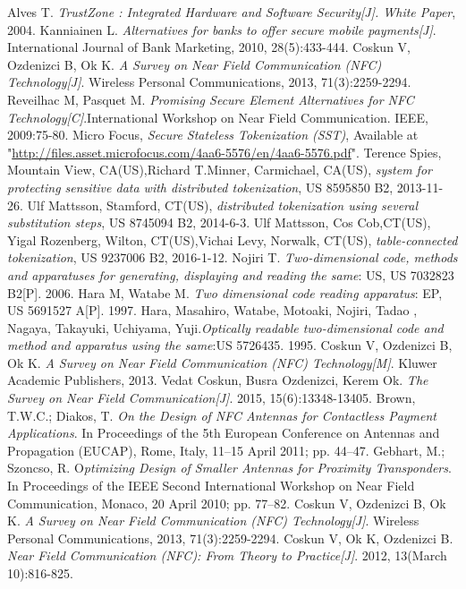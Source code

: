 \documentclass[journal]{IEEEtran}
\begin{document}
\begin{thebibliography}{1}
Alves T. \emph{TrustZone : Integrated Hardware and Software Security[J]. White Paper}, 2004.
Kanniainen L. \emph{Alternatives for banks to offer secure mobile payments[J]}. International Journal of Bank Marketing, 2010, 28(5):433-444.
Coskun V, Ozdenizci B, Ok K. \emph{A Survey on Near Field Communication (NFC) Technology[J]}. Wireless Personal Communications, 2013, 71(3):2259-2294.
Reveilhac M, Pasquet M. \emph{Promising Secure Element Alternatives for NFC Technology[C]}.International Workshop on Near Field Communication. IEEE, 2009:75-80.
Micro Focus, \emph{Secure Stateless Tokenization (SST)}, Available at "\url{http://files.asset.microfocus.com/4aa6-5576/en/4aa6-5576.pdf}".
Terence Spies, Mountain View, CA(US),Richard T.Minner, Carmichael, CA(US), \emph{system for protecting sensitive data with distributed tokenization}, US 8595850 B2, 2013-11-26.
Ulf Mattsson, Stamford, CT(US), \emph{distributed tokenization using several substitution steps}, US 8745094 B2, 2014-6-3.
Ulf Mattsson, Cos Cob,CT(US), Yigal Rozenberg, Wilton, CT(US),Vichai Levy, Norwalk, CT(US), \emph{table-connected tokenization}, US 9237006 B2, 2016-1-12. 
Nojiri T. \emph{Two-dimensional code, methods and apparatuses for generating, displaying and reading the same}: US, US 7032823 B2[P]. 2006.
Hara M, Watabe M. \emph{Two dimensional code reading apparatus}: EP, US 5691527 A[P]. 1997.
Hara, Masahiro, Watabe, Motoaki, Nojiri, Tadao , Nagaya, Takayuki, Uchiyama, Yuji.\emph{Optically readable two-dimensional code and method and apparatus using the same}:US 5726435. 1995.
Coskun V, Ozdenizci B, Ok K. \emph{A Survey on Near Field Communication (NFC) Technology[M]}. Kluwer Academic Publishers, 2013.
Vedat Coskun, Busra Ozdenizci, Kerem Ok. \emph{The Survey on Near Field Communication[J]}. 2015, 15(6):13348-13405.
Brown, T.W.C.; Diakos, T. \emph{On the Design of NFC Antennas for Contactless Payment Applications}. In Proceedings of the 5th European Conference on Antennas and Propagation (EUCAP), Rome, Italy, 11–15 April 2011; pp. 44–47.
Gebhart, M.; Szoncso, R. O\emph{ptimizing Design of Smaller Antennas for Proximity Transponders}.
In Proceedings of the IEEE Second International Workshop on Near Field Communication,
Monaco, 20 April 2010; pp. 77–82.
Coskun V, Ozdenizci B, Ok K. \emph{A Survey on Near Field Communication (NFC) Technology[J]}. Wireless Personal Communications, 2013, 71(3):2259-2294.
Coskun V, Ok K, Ozdenizci B. \emph{Near Field Communication (NFC): From Theory to Practice[J]}. 2012, 13(March 10):816-825.


\end{thebibliography}
\end{document}
